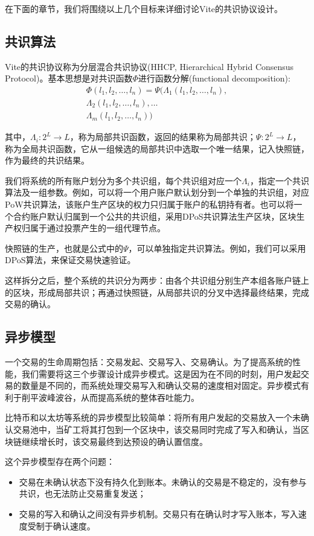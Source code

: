 \documentclass[UTF8,nofonts]{ctexart}
\begin{document}
\begin{multicols}{2}
在下面的章节，我们将围绕以上几个目标来详细讨论Vite的共识协议设计。

\subsection{共识算法}
Vite的共识协议称为分层混合共识协议(HHCP, Hierarchical Hybrid Consensus Protocol)。基本思想是对共识函数$\Phi$进行函数分解(functional decomposition):
\begin{equation}
\begin{split}
\Phi(l_1,l_2,\dots,l_n) = \Psi(\Lambda_1(l_1,l_2,\dots,l_n), \\
\Lambda_2(l_1,l_2,\dots,l_n),\dots \\
\Lambda_m(l_1,l_2,\dots,l_n))
\end{split}
\end{equation}

其中，$\Lambda_i: 2^L \rightarrow L$，称为局部共识函数，返回的结果称为局部共识；$\Psi: 2^L \rightarrow L$，称为全局共识函数，它从一组候选的局部共识中选取一个唯一结果，记入快照链，作为最终的共识结果。

我们将系统的所有账户划分为多个共识组，每个共识组对应一个$\Lambda_i$，指定一个共识算法及一组参数。例如，可以将一个用户账户默认划分到一个单独的共识组，对应PoW共识算法，该账户生产区块的权力只归属于账户的私钥持有者。也可以将一个合约账户默认归属到一个公共的共识组，采用DPoS共识算法生产区块，区块生产权归属于通过投票产生的一组代理节点。

快照链的生产，也就是公式中的$\Psi$，可以单独指定共识算法。例如，我们可以采用DPoS算法，来保证交易快速验证。

这样拆分之后，整个系统的共识分为两步：由各个共识组分别生产本组各账户链上的区块，形成局部共识；再通过快照链，从局部共识的分叉中选择最终结果，完成交易的确认。

\subsection{异步模型}
一个交易的生命周期包括：交易发起、交易写入、交易确认。为了提高系统的性能，我们需要将这三个步骤设计成异步模式。这是因为在不同的时刻，用户发起交易的数量是不同的，而系统处理交易写入和确认交易的速度相对固定。异步模式有利于削平波峰波谷，从而提高系统的整体吞吐能力。

比特币和以太坊等系统的异步模型比较简单：将所有用户发起的交易放入一个未确认交易池中，当矿工将其打包到一个区块中，该交易同时完成了写入和确认，当区块链继续增长时，该交易最终到达预设的确认置信度。

这个异步模型存在两个问题：
\begin{itemize}
	\item 交易在未确认状态下没有持久化到账本。未确认的交易是不稳定的，没有参与共识，也无法防止交易重复发送；
	\item 交易的写入和确认之间没有异步机制。交易只有在确认时才写入账本，写入速度受制于确认速度。
\end{itemize}


\end{multicols}
\end{document}
